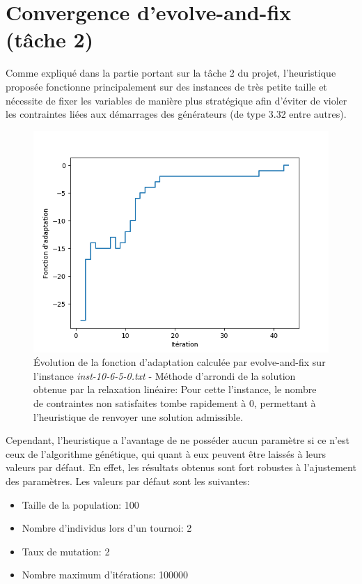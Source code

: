 \vspace*{1.2cm}


\section{Convergence d'evolve-and-fix (tâche 2)}

Comme expliqué dans la partie portant sur la tâche 2 du projet, 
l'heuristique proposée fonctionne principalement sur des instances de très petite
taille et nécessite de fixer les variables de manière plus stratégique afin
d'éviter de violer les contraintes liées aux démarrages des générateurs
(de type 3.32 entre autres).

\begin{figure}[h!]
\begin{center}
	\includegraphics[width=.5\textwidth]{imgs/round}
	\caption{\'Evolution de la fonction d'adaptation calculée par evolve-and-fix
    sur l'instance \textit{inst-10-6-5-0.txt} - Méthode d'arrondi de la solution
    obtenue par la relaxation linéaire: Pour cette l'instance, le nombre de contraintes
    non satisfaites tombe rapidement à 0, permettant à l'heuristique de renvoyer
    une solution admissible.}
\end{center}
\end{figure}

Cependant, l'heuristique a l'avantage de ne posséder aucun paramètre si ce n'est ceux
de l'algorithme génétique, qui quant à eux peuvent être laissés à leurs valeurs par
défaut. En effet, les résultats obtenus sont fort robustes à l'ajustement des paramètres.
Les valeurs par défaut sont les suivantes:
\begin{itemize}
    \item Taille de la population: 100
    \item Nombre d'individus lors d'un tournoi: 2
    \item Taux de mutation: 2
    \item Nombre maximum d'itérations: 100000
\end{itemize}


